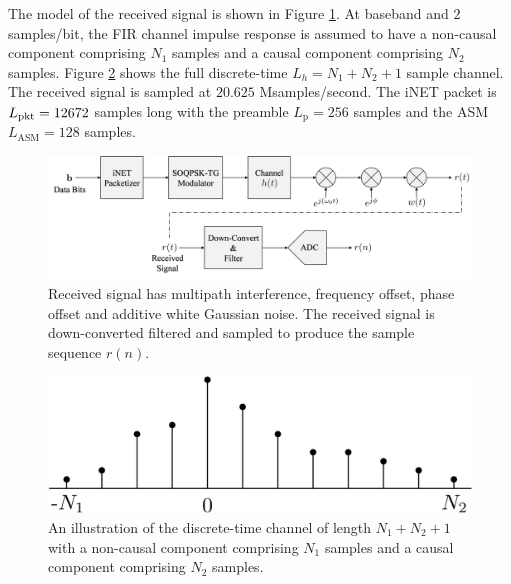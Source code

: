 The model of the received signal is shown in Figure \ref{fig:received1}.
At baseband and $2$ samples/bit, the FIR channel impulse response is assumed to have a non-causal component comprising $N_1$ samples and a causal component comprising $N_2$ samples.
Figure \ref{fig:channelExample} shows the full discrete-time $L_h = N_1+N_2+1$ sample channel.
The received signal is sampled at $20.625$ Msamples/second.
The iNET packet is $L_\text{pkt}=12672$ samples long with the preamble $L_\text{p}=256$ samples and the ASM $L_\text{ASM}=128$ samples.
\begin{figure}
	\centering\includegraphics[width=12.33in/100*50]{figures/intro/received1.pdf}
	\caption{Received signal has multipath interference, frequency offset, phase offset and additive white Gaussian noise. The received signal is down-converted filtered and sampled to produce the sample sequence $r(n)$.}
	\label{fig:received1}
\end{figure}
\begin{figure}
	\centering\includegraphics[width=5.5in/100*55]{figures/intro/channelExample.pdf}
	\caption{An illustration of the discrete-time channel of length $N_1+N_2+1$ with a non-causal component comprising $N_1$ samples and a causal component comprising $N_2$ samples.}
	\label{fig:channelExample}
\end{figure}

